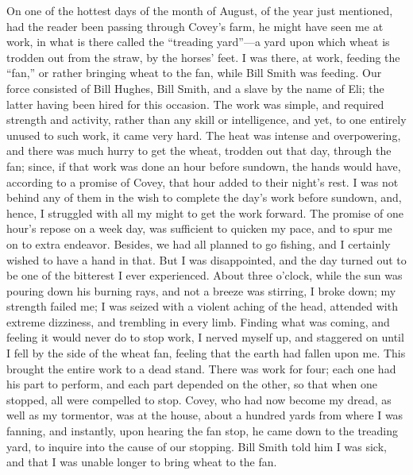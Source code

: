 On one of the hottest days of the month of August, of the year just
mentioned, had the reader been passing through Covey's farm, he might
have seen me at work, in what is there called the ``treading yard''---a
yard upon which wheat is trodden out from the straw, by the horses'
feet. I was there, at work, feeding the ``fan,'' or rather bringing
wheat to the fan, while Bill Smith was feeding. Our force consisted of
Bill Hughes, Bill Smith, and a slave by the name of Eli; the latter
having been hired for this occasion. The work was simple, and required
strength and activity, rather than any skill or intelligence, and yet,
to one entirely unused to such work, it came very hard. The heat was
intense and overpowering, and there was much hurry to get the wheat,
trodden out that day, through the fan; since, if that work was done an
hour before sundown, the hands would have, according to a promise of
Covey, that hour added to their night's rest. I was not behind any of
them in the wish to complete the day's work before sundown, and, hence,
I struggled with all my might to get the work forward. The {}promise of
one hour's repose on a week day, was sufficient to quicken my pace, and
to spur me on to extra endeavor. Besides, we had all planned to go
fishing, and I certainly wished to have a hand in that. But I was
disappointed, and the day turned out to be one of the bitterest I ever
experienced. About three o'clock, while the sun was pouring down his
burning rays, and not a breeze was stirring, I broke down; my strength
failed me; I was seized with a violent aching of the head, attended with
extreme dizziness, and trembling in every limb. Finding what was coming,
and feeling it would never do to stop work, I nerved myself up, and
staggered on until I fell by the side of the wheat fan, feeling that the
earth had fallen upon me. This brought the entire work to a dead stand.
There was work for four; each one had his part to perform, and each part
depended on the other, so that when one stopped, all were compelled to
stop. Covey, who had now become my dread, as well as my tormentor, was
at the house, about a hundred yards from where I was fanning, and
instantly, upon hearing the fan stop, he came down to the treading yard,
to inquire into the cause of our stopping. Bill Smith told him I was
sick, and that I was unable longer to bring wheat to the fan.


